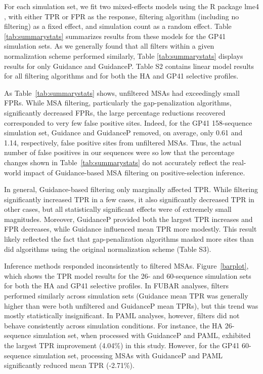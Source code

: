 \documentclass[11pt]{article}
\begin{document}
For each simulation set, we fit two mixed-effects models using the R package lme4 \citep{Bates2012}, with either TPR or FPR as the response, filtering algorithm (including no filtering) as a fixed effect, and simulation count as a random effect. Table \ref{tab:summarystats} summarizes results from these models for the GP41 simulation sets. As we generally found that all filters within a given normalization scheme performed similarly, Table \ref{tab:summarystats} displays results for only Guidance and GuidanceP. Table S2 contains linear model results for all filtering algorithms and for both the HA and GP41 selective profiles.

As Table~\ref{tab:summarystats} shows, unfiltered MSAs had exceedingly small FPRs. While MSA filtering, particularly the gap-penalization algorithms, significantly decreased FPRs, the large percentage reductions recovered corresponded to very few false positive sites. Indeed, for the GP41 158-sequence simulation set, Guidance and GuidanceP removed, on average, only 0.61 and 1.14, respectively, false positive sites from unfiltered MSAs. Thus, the actual number of false positives in our sequences were so low that the percentage changes shown in Table~\ref{tab:summarystats} do not accurately reflect the real-world impact of Guidance-based MSA filtering on positive-selection inference.

In general, Guidance-based filtering only marginally affected TPR. While filtering significantly increased TPR in a few cases, it also significantly decreased TPR in other cases, but all statistically significant effects were of extremely small magnitudes. Moreover, GuidanceP provided both the largest TPR increases and FPR decreases, while Guidance influenced mean TPR more modestly. This result likely reflected the fact that gap-penalization algorithms masked more sites than did algorithms using the original normalization scheme (Table S3). 

Inference methods responded inconsistently to filtered MSAs. Figure~\ref{barplot}, which shows the TPR model results for the 26- and 60-sequence simulation sets for both the HA and GP41 selective profiles. In FUBAR analyses, filters performed similarly across simulation sets (Guidance mean TPR was generally higher than were both unfiltered and GuidanceP mean TPRs), but this trend was mostly statistically insignificant. In PAML analyses, however, filters did not behave consistently across simulation conditions. For instance, the HA 26-sequence simulation set, when processed with GuidanceP and PAML, exhibited the largest TPR improvement (4.04\%) in this study. However, for the GP41 60-sequence simulation set, processing MSAs with GuidanceP and PAML significantly reduced mean TPR (-2.71\%).
\end{document}

